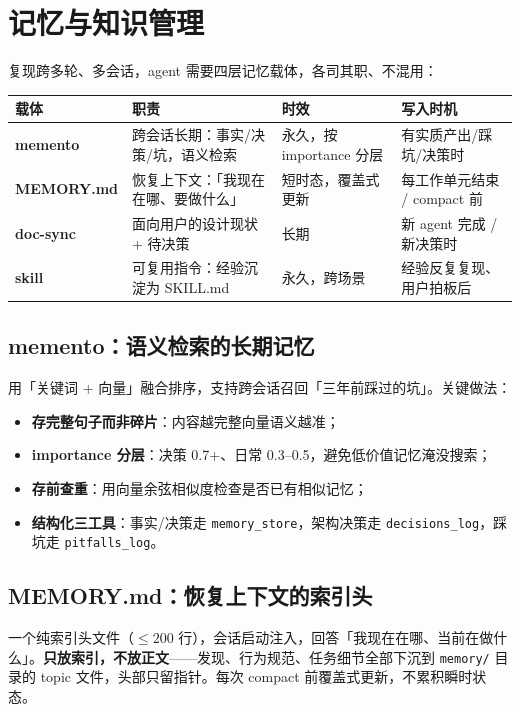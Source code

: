 \section{记忆与知识管理}

复现跨多轮、多会话，agent 需要四层记忆载体，各司其职、不混用：

\begin{table}[H]
\centering\small
\begin{tabular}{@{}p{3.2cm}p{3.4cm}p{3.4cm}p{2.6cm}@{}}
\toprule
载体 & 职责 & 时效 & 写入时机 \\
\midrule
\textbf{memento} & 跨会话长期：事实/决策/坑，语义检索 & 永久，按 importance 分层 & 有实质产出/踩坑/决策时 \\
\textbf{MEMORY.md} & 恢复上下文：「我现在在哪、要做什么」 & 短时态，覆盖式更新 & 每工作单元结束 / compact 前 \\
\textbf{doc-sync} & 面向用户的设计现状 + 待决策 & 长期 & 新 agent 完成 / 新决策时 \\
\textbf{skill} & 可复用指令：经验沉淀为 SKILL.md & 永久，跨场景 & 经验反复复现、用户拍板后 \\
\bottomrule
\end{tabular}
\end{table}

\subsection{memento：语义检索的长期记忆}

用「关键词 + 向量」融合排序，支持跨会话召回「三年前踩过的坑」。关键做法：

\begin{itemize}
  \item \textbf{存完整句子而非碎片}：内容越完整向量语义越准；
  \item \textbf{importance 分层}：决策 0.7+、日常 0.3--0.5，避免低价值记忆淹没搜索；
  \item \textbf{存前查重}：用向量余弦相似度检查是否已有相似记忆；
  \item \textbf{结构化三工具}：事实/决策走 \texttt{memory\_store}，架构决策走 \texttt{decisions\_log}，踩坑走 \texttt{pitfalls\_log}。
\end{itemize}

\subsection{MEMORY.md：恢复上下文的索引头}

一个纯索引头文件（$\le200$ 行），会话启动注入，回答「我现在在哪、当前在做什么」。\textbf{只放索引，不放正文}——发现、行为规范、任务细节全部下沉到 \texttt{memory/} 目录的 topic 文件，头部只留指针。每次 compact 前覆盖式更新，不累积瞬时状态。

